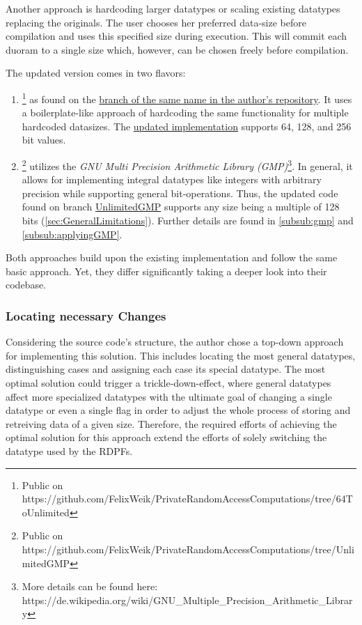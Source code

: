 \label{sub:IncreasingTheSizeOfExistingDPFs}
Another approach is hardcoding larger datatypes or scaling existing datatypes replacing the originals.
The user chooses her preferred data-size before compilation and uses this specified size during execution.
This will commit each duoram to a single size which, however, can be chosen freely before compilation.

The updated version comes in two flavors:
\begin{enumerate}
    \item {}\footnote{Public on https://github.com/FelixWeik/PrivateRandomAccessComputations/tree/64ToUnlimited} as found on the \hyperlink{https://github.com/FelixWeik/PrivateRandomAccessComputations/tree/64ToUnlimited}{branch of the same name in the author's repository}.
    It uses a boilerplate-like approach of hardcoding the same functionality for multiple hardcoded datasizes.
    The \hyperlink{https://github.com/FelixWeik/PrivateRandomAccessComputations/tree/64ToUnlimited}{updated implementation} supports 64, 128, and 256 bit values.
    \item {}\footnote{Public on https://github.com/FelixWeik/PrivateRandomAccessComputations/tree/UnlimitedGMP} utilizes the \textit{GNU Multi Precision Arithmetic Library (GMP)}\footnote{More details can be found here: https://de.wikipedia.org/wiki/GNU\_Multiple\_Precision\_Arithmetic\_Library}.
    In general, it allows for implementing integral datatypes like integers with arbitrary precision while supporting general bit-operations.
    Thus, the updated code found on branch \hyperlink{https://github.com/FelixWeik/PrivateRandomAccessComputations/tree/UnlimitedGMP}{UnlimitedGMP} supports any size being a multiple of 128 bits (\ref{sec:GeneralLimitations}).
    Further details are found in \ref{subsub:gmp} and \ref{subsub:applyingGMP}.
\end{enumerate}

Both approaches build upon the existing implementation and follow the same basic approach.
Yet, they differ significantly taking a deeper look into their codebase.

\subsubsection*{Locating necessary Changes} \label{subsub:necessaryChanges}
Considering the source code's structure, the author chose a top-down approach for implementing this solution.
This includes locating the most general datatypes, distinguishing cases and assigning each case its special datatype.
The most optimal solution could trigger a trickle-down-effect, where general datatypes affect more specialized datatypes with the ultimate goal of changing a single datatype or even a single flag in order to adjust the whole process of storing and retreiving data of a given size.
Therefore, the required efforts of achieving the optimal solution for this approach extend the efforts of solely switching the datatype used by the RDPFs.


